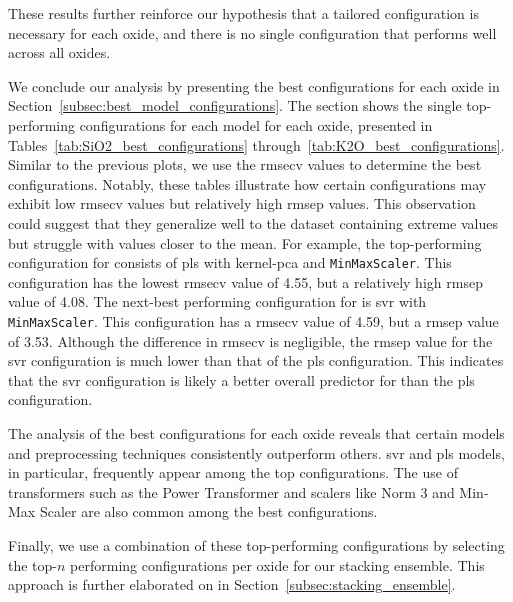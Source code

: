 These results further reinforce our hypothesis that a tailored configuration is necessary for each oxide, and there is no single configuration that performs well across all oxides.



We conclude our analysis by presenting the best configurations for each oxide in Section~\ref{subsec:best_model_configurations}.
The section shows the single top-performing configurations for each model for each oxide, presented in Tables~\ref{tab:SiO2_best_configurations} through~\ref{tab:K2O_best_configurations}.
Similar to the previous plots, we use the \gls{rmsecv} values to determine the best configurations.
Notably, these tables illustrate how certain configurations may exhibit low \gls{rmsecv} values but relatively high \gls{rmsep} values.
This observation could suggest that they generalize well to the dataset containing extreme values but struggle with values closer to the mean.
For example, the top-performing configuration for  consists of \gls{pls} with \gls{kernel-pca} and \texttt{MinMaxScaler}.
This configuration has the lowest \gls{rmsecv} value of 4.55, but a relatively high \gls{rmsep} value of 4.08.
The next-best performing configuration for  is \gls{svr} with \texttt{MinMaxScaler}.
This configuration has a \gls{rmsecv} value of 4.59, but a \gls{rmsep} value of 3.53.
Although the difference in \gls{rmsecv} is negligible, the \gls{rmsep} value for the \gls{svr} configuration is much lower than that of the \gls{pls} configuration.
This indicates that the \gls{svr} configuration is likely a better overall predictor for  than the \gls{pls} configuration.

The analysis of the best configurations for each oxide reveals that certain models and preprocessing techniques consistently outperform others. \gls{svr} and \gls{pls} models, in particular, frequently appear among the top configurations. The use of transformers such as the Power Transformer and scalers like Norm 3 and Min-Max Scaler are also common among the best configurations.

Finally, we use a combination of these top-performing configurations by selecting the top-$n$ performing configurations per oxide for our stacking ensemble.
This approach is further elaborated on in Section~\ref{subsec:stacking_ensemble}.